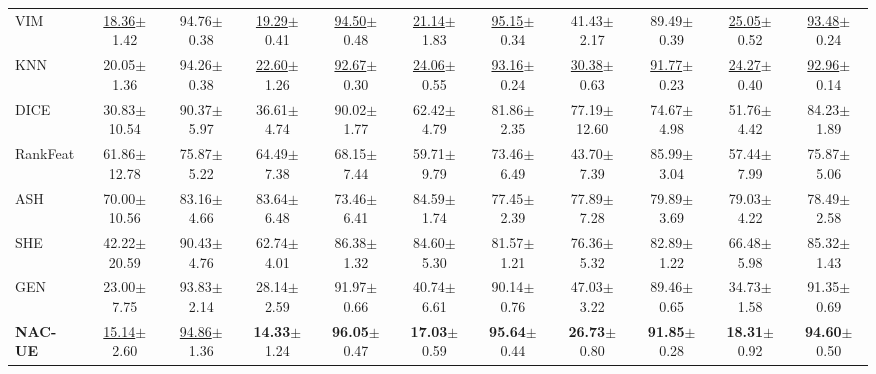 \documentclass{article} \usepackage{iclr2024_conference,times}
\begin{document}
\begin{table*}[h]
{\begin{tabular}{l cc cc cc cc cc}
			VIM & \underline{18.36}{\tiny$\pm$1.42} & 94.76{\tiny$\pm$0.38} & \underline{19.29}{\tiny$\pm$0.41} & \underline{94.50}{\tiny$\pm$0.48} & \underline{21.14}{\tiny$\pm$1.83} & \underline{95.15}{\tiny$\pm$0.34} & 41.43{\tiny$\pm$2.17} & 89.49{\tiny$\pm$0.39} & \underline{25.05}{\tiny$\pm$0.52} & \underline{93.48}{\tiny$\pm$0.24} \\ 
			KNN & 20.05{\tiny$\pm$1.36} & 94.26{\tiny$\pm$0.38} & \underline{22.60}{\tiny$\pm$1.26} & \underline{92.67}{\tiny$\pm$0.30} & \underline{24.06}{\tiny$\pm$0.55} & \underline{93.16}{\tiny$\pm$0.24} & \underline{30.38}{\tiny$\pm$0.63} & \underline{91.77}{\tiny$\pm$0.23} & \underline{24.27}{\tiny$\pm$0.40} & \underline{92.96}{\tiny$\pm$0.14} \\ 
			DICE & 30.83{\tiny$\pm$10.54} & 90.37{\tiny$\pm$5.97} & 36.61{\tiny$\pm$4.74} & 90.02{\tiny$\pm$1.77} & 62.42{\tiny$\pm$4.79} & 81.86{\tiny$\pm$2.35} & 77.19{\tiny$\pm$12.60} & 74.67{\tiny$\pm$4.98} & 51.76{\tiny$\pm$4.42} & 84.23{\tiny$\pm$1.89} \\ 
			RankFeat & 61.86{\tiny$\pm$12.78} & 75.87{\tiny$\pm$5.22} & 64.49{\tiny$\pm$7.38} & 68.15{\tiny$\pm$7.44} & 59.71{\tiny$\pm$9.79} & 73.46{\tiny$\pm$6.49} & 43.70{\tiny$\pm$7.39} & 85.99{\tiny$\pm$3.04} & 57.44{\tiny$\pm$7.99} & 75.87{\tiny$\pm$5.06} \\ 
			ASH & 70.00{\tiny$\pm$10.56} & 83.16{\tiny$\pm$4.66} & 83.64{\tiny$\pm$6.48} & 73.46{\tiny$\pm$6.41} & 84.59{\tiny$\pm$1.74} & 77.45{\tiny$\pm$2.39} & 77.89{\tiny$\pm$7.28} & 79.89{\tiny$\pm$3.69} & 79.03{\tiny$\pm$4.22} & 78.49{\tiny$\pm$2.58} \\ 
			SHE & 42.22{\tiny$\pm$20.59} & 90.43{\tiny$\pm$4.76} & 62.74{\tiny$\pm$4.01} & 86.38{\tiny$\pm$1.32} & 84.60{\tiny$\pm$5.30} & 81.57{\tiny$\pm$1.21} & 76.36{\tiny$\pm$5.32} & 82.89{\tiny$\pm$1.22} & 66.48{\tiny$\pm$5.98} & 85.32{\tiny$\pm$1.43} \\ 
			GEN & 23.00{\tiny$\pm$7.75} & 93.83{\tiny$\pm$2.14} & 28.14{\tiny$\pm$2.59} & 91.97{\tiny$\pm$0.66} & 40.74{\tiny$\pm$6.61} & 90.14{\tiny$\pm$0.76} & 47.03{\tiny$\pm$3.22} & 89.46{\tiny$\pm$0.65} & 34.73{\tiny$\pm$1.58} & 91.35{\tiny$\pm$0.69} \\ 
			\rowcolor{LightGray}
			\textbf{NAC-UE} & \underline{15.14}{\tiny$\pm$2.60}  & \underline{94.86}{\tiny$\pm$1.36}  & \textbf{14.33}{\tiny$\pm$1.24}  & \textbf{96.05}{\tiny$\pm$0.47}  & \textbf{17.03}{\tiny$\pm$0.59}  & \textbf{95.64}{\tiny$\pm$0.44}  & \textbf{26.73}{\tiny$\pm$0.80}  &  \textbf{91.85}{\tiny$\pm$0.28}  & \textbf{18.31}{\tiny$\pm$0.92} &  \textbf{94.60}{\tiny$\pm$0.50} \\ 
			\bottomrule
		\end{tabular}
		
}
\end{table*}
\end{document}
